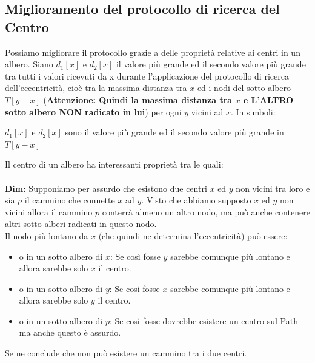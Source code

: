 \subsection{Miglioramento del protocollo di ricerca del Centro}
Possiamo migliorare il protocollo grazie a delle proprietà relative ai centri in un albero. Siano $d_1[x]$ e $d_2[x]$ il valore più grande ed il secondo valore più grande tra tutti i valori ricevuti da x durante l'applicazione del protocollo di ricerca dell'eccentricità, cioè tra la massima distanza tra $x$ ed i nodi del sotto albero $T[y-x]$ (\textbf{Attenzione: Quindi la massima distanza tra $x$ e L'ALTRO sotto albero NON radicato in lui}) per ogni $y$ vicini ad $x$. In simboli: 
\begin{center}
    $d_1[x]$ e $d_2[x]$ sono il valore più grande ed il secondo valore più grande in $T[y-x]$ 
\end{center}
Il centro di un albero ha interessanti proprietà tra le quali:\\
\\
\textbf{Dim:} Supponiamo per assurdo che  esistono due centri $x$ ed $y$ non vicini tra loro e sia $p$ il cammino che connette $x$ ad $y$. Visto che abbiamo supposto $x$ ed $y$ non vicini allora il cammino $p$ conterrà almeno un altro nodo, ma può anche contenere altri sotto alberi radicati in questo nodo.\\
Il nodo più lontano da $x$ (che quindi ne determina l'eccentricità) può essere:
\begin{itemize}
    \item o in un sotto albero di $x$: Se così fosse $y$ sarebbe comunque più lontano e allora sarebbe solo $x$ il centro.
    \item o in un sotto albero di $y$: Se così fosse $x$ sarebbe comunque più lontano e allora sarebbe solo $y$ il centro.
    \item o in un sotto albero di $p$: Se così fosse dovrebbe esistere un centro sul Path ma anche questo è assurdo.
\end{itemize}
Se ne conclude che non può esistere un cammino tra i due centri.



